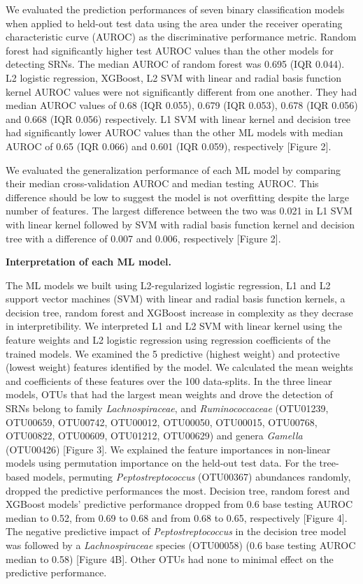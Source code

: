 \documentclass[11pt,]{article}
\begin{document}
We evaluated the prediction performances of seven binary classification
models when applied to held-out test data using the area under the
receiver operating characteristic curve (AUROC) as the discriminative
performance metric. Random forest had significantly higher test AUROC
values than the other models for detecting SRNs. The median AUROC of
random forest was 0.695 (IQR 0.044). L2 logistic regression, XGBoost, L2
SVM with linear and radial basis function kernel AUROC values were not
significantly different from one another. They had median AUROC values
of 0.68 (IQR 0.055), 0.679 (IQR 0.053), 0.678 (IQR 0.056) and 0.668 (IQR
0.056) respectively. L1 SVM with linear kernel and decision tree had
significantly lower AUROC values than the other ML models with median
AUROC of 0.65 (IQR 0.066) and 0.601 (IQR 0.059), respectively {[}Figure
2{]}.

We evaluated the generalization performance of each ML model by
comparing their median cross-validation AUROC and median testing AUROC.
This difference should be low to suggest the model is not overfitting
despite the large number of features. The largest difference between the
two was 0.021 in L1 SVM with linear kernel followed by SVM with radial
basis function kernel and decision tree with a difference of 0.007 and
0.006, respectively {[}Figure 2{]}.

\textbf{Interpretation of each ML model.}

The ML models we built using L2-regularized logistic regression, L1 and
L2 support vector machines (SVM) with linear and radial basis function
kernels, a decision tree, random forest and XGBoost increase in
complexity as they decrase in interpretibility. We interpreted L1 and L2
SVM with linear kernel using the feature weights and L2 logistic
regression using regression coefficients of the trained models. We
examined the 5 predictive (highest weight) and protective (lowest
weight) features identified by the model. We calculated the mean weights
and coefficients of these features over the 100 data-splits. In the
three linear models, OTUs that had the largest mean weights and drove
the detection of SRNs belong to family \emph{Lachnospiraceae}, and
\emph{Ruminococcaceae} (OTU01239, OTU00659, OTU00742, OTU00012,
OTU00050, OTU00015, OTU00768, OTU00822, OTU00609, OTU01212, OTU00629)
and genera \emph{Gamella} (OTU00426) {[}Figure 3{]}. We explained the
feature importances in non-linear models using permutation importance on
the held-out test data. For the tree-based models, permuting
\emph{Peptostreptococcus} (OTU00367) abundances randomly, dropped the
predictive performances the most. Decision tree, random forest and
XGBoost models' predictive performance dropped from 0.6 base testing
AUROC median to 0.52, from 0.69 to 0.68 and from 0.68 to 0.65,
respectively {[}Figure 4{]}. The negative predictive impact of
\emph{Peptostreptococcus} in the decision tree model was followed by a
\emph{Lachnospiraceae} species (OTU00058) (0.6 base testing AUROC median
to 0.58) {[}Figure 4B{]}. Other OTUs had none to minimal effect on the
predictive performance.
\end{document}
